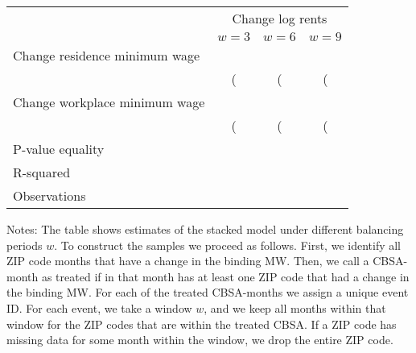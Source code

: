 \begin{table}[]
    \caption{Effect of increase in federal MW to \$9 in January 2020}
    \label{tab:stacked}
    \centering

    \begin{table}[]
        \begin{tabular}{@{}lccc@{}}
        \toprule
                                      & \multicolumn{3}{c}{Change log rents} \\ \cmidrule(l){2-4} 
                                      & $w=3$      & $w=6$     & $w=9 $      \\ \midrule
        Change residence minimum wage & #4#        & #4#       &  #4#        \\
                                      & (#4#)      & (#4#)     & (#4#)       \\
        Change workplace minimum wage & #4#        & #4#       & #4#         \\
                                      & (#4#)      & (#4#)     & (#4#)       \\ \midrule
        P-value equality              & #4#        & #4#       & #4#         \\
        R-squared                     & #4#        & #4#       & #4#         \\
        Observations                  & #0,#       & #0,#      & #0,#        \\ \bottomrule
        \end{tabular}
    \end{table}
    
    \begin{minipage}{.95\textwidth} \footnotesize
        \vspace{2mm}
        Notes: The table shows estimates of the stacked model under different balancing
        periods $w$.
        To construct the samples we proceed as follows. First, we identify all ZIP code months
        that have a change in the binding MW. Then, we call a CBSA-month as treated if in 
        that month has at least one ZIP code that had a change in the binding MW. For each 
        of the treated CBSA-months we assign a unique event ID. For each event, we take a 
        window $w$, and we keep all months within that window for the ZIP codes that are within
        the treated CBSA. If a ZIP code has missing data for some month within the window, 
        we drop the entire ZIP code. 
    \end{minipage}
\end{table}
